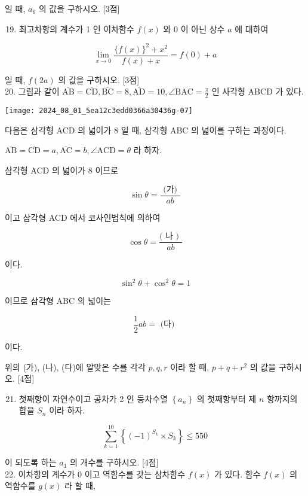 \documentclass[10pt]{article}
\begin{document}
일 때, $a_{6}$ 의 값을 구하시오. [3점]

\begin{enumerate}
  \setcounter{enumi}{18}
  \item 최고차항의 계수가 1 인 이차함수 $f(x)$ 와 0 이 아닌 상수 $a$ 에 대하여
\end{enumerate}

\[
\lim _{x \rightarrow 0} \frac{\{f(x)\}^{2}+x^{2}}{f(x)+x}=f(0)+a
\]

일 때, $f(2 a)$ 의 값을 구하시오. [3점]\\
20. 그림과 같이 $\overline{\mathrm{AB}}=\overline{\mathrm{CD}}, \overline{\mathrm{BC}}=8, \overline{\mathrm{AD}}=10, \angle \mathrm{BAC}=\frac{\pi}{2}$ 인 사각형 ABCD 가 있다.

\begin{center}
\texttt{[image: 2024\_08\_01\_5ea12c3edd0366a30436g-07]}
\end{center}

다음은 삼각형 ACD 의 넓이가 8 일 때, 삼각형 ABC 의 넓이를 구하는 과정이다.

$\overline{\mathrm{AB}}=\overline{\mathrm{CD}}=a, \overline{\mathrm{AC}}=b, \angle \mathrm{ACD}=\theta$ 라 하자.

삼각형 ACD 의 넓이가 8 이므로

\[
\sin \theta=\frac{\text { (가) }}{a b}
\]

이고 삼각형 ACD 에서 코사인법칙에 의하여

\[
\cos \theta=\frac{(\text { 나 ) }}{a b}
\]

이다.

\[
\sin ^{2} \theta+\cos ^{2} \theta=1
\]

이므로 삼각형 ABC 의 넓이는

\[
\frac{1}{2} a b=\text { (다) }
\]

이다.

위의 (가), (나), (다)에 알맞은 수를 각각 $p, q, r$ 이라 할 때, $p+q+r^{2}$ 의 값을 구하시오. [4점]

\begin{enumerate}
  \setcounter{enumi}{20}
  \item 첫째항이 자연수이고 공차가 2 인 등차수열 $\left\{a_{n}\right\}$ 의 첫째항부터 제 $n$ 항까지의 합을 $S_{n}$ 이라 하자.
\end{enumerate}

\[
\sum_{k=1}^{10}\left\{(-1)^{S_{k}} \times S_{k}\right\} \leq 550
\]

이 되도록 하는 $a_{1}$ 의 개수를 구하시오. [4점]\\
22. 이차항의 계수가 0 이고 역함수를 갖는 삼차함수 $f(x)$ 가 있다. 함수 $f(x)$ 의 역함수를 $g(x)$ 라 할 때,
\end{document}
